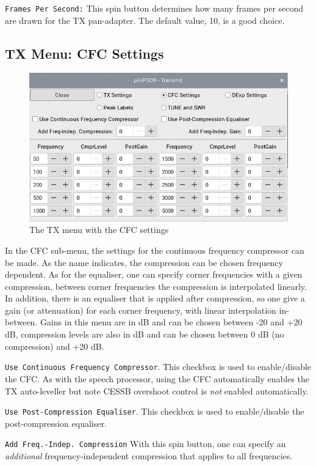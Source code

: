 \documentclass[12pt]{book}
\def\rett#1{\texttt{\color{red}#1}}
\begin{document}
\rett{Frames Per Second:} This spin button determines how many frames per second are drawn for the TX
pan-adapter. The default value, 10, is a good choice.

\subsection{TX Menu: CFC Settings}
\label{sec:cfc}

\begin{figure}[ht]
\center
\includegraphics[scale=0.45]{TX_CFC.png}
\caption{The TX menu with the CFC settings}
\label{fig:CFCmenu}
\end{figure}

In the CFC sub-menu, the settings for the continuous frequency compressor can be made.
As the name indicates, the compression can be chosen frequency dependent. As for the
equaliser, one can specify corner frequencies with a given compression, between corner
frequencies the compression is interpolated linearly. In addition, there is an equaliser that
is applied after compression, so one give a gain (or attenuation) for each corner
frequency, with linear interpolation in-between. Gains in this menu are in dB and
can be chosen between -20 and +20 dB, compression levels are also in dB and can be chosen
between 0 dB (no compression) and +20 dB.

\rett{Use Continuous Frequency Compressor}. This checkbox is used to enable/disable the CFC. As with
the speech processor, using the CFC automatically enables the TX auto-leveller but note CESSB
overshoot control is \textit{not} enabled automatically.

\rett{Use Post-Compression Equaliser}. This checkbox is used  to enable/disable the post-compression
equaliser.

\rett{Add Freq.-Indep. Compression} With this spin button, one can specify an \textit{additional}
frequency-independent compression that applies to all frequencies.
\end{document}
